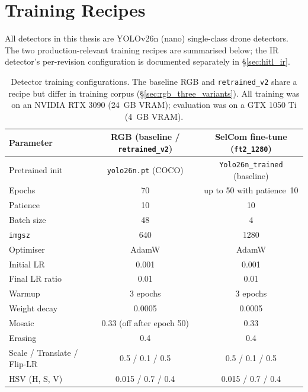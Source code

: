 \documentclass[12pt,a4paper,oneside,openright]{book}
\begin{document}
\section{Training Recipes}
\label{sec:training_recipes}

All detectors in this thesis are YOLOv26n (nano) single-class drone detectors. The two production-relevant training recipes are summarised below; the IR detector's per-revision configuration is documented separately in \S\ref{sec:hitl_ir}.

\begin{table}[htbp]
    \centering
    \caption{Detector training configurations. The baseline RGB and \texttt{retrained\_v2} share a recipe but differ in training corpus (\S\ref{sec:rgb_three_variants}). All training was on an NVIDIA RTX 3090 (24~GB VRAM); evaluation was on a GTX 1050 Ti (4~GB VRAM).}
    \label{tab:training_recipes}
    \begin{tabular}{lcc}
        \toprule
        Parameter & RGB (baseline / \texttt{retrained\_v2}) & SelCom fine-tune (\texttt{ft2\_1280}) \\
        \midrule
        Pretrained init   & \texttt{yolo26n.pt} (COCO) & \texttt{Yolo26n\_trained} (baseline)        \\
        Epochs            & 70                         & up to 50 with patience~10                   \\
        Patience          & 10                         & 10                                          \\
        Batch size        & 48                         & 4                                           \\
        \texttt{imgsz}    & 640                        & 1280                                        \\
        Optimiser         & AdamW                      & AdamW                                       \\
        Initial LR        & 0.001                      & 0.001                                       \\
        Final LR ratio    & 0.01                       & 0.01                                        \\
        Warmup            & 3 epochs                   & 3 epochs                                    \\
        Weight decay      & 0.0005                     & 0.0005                                      \\
        Mosaic            & 0.33 (off after epoch 50)  & 0.33                                        \\
        Erasing           & 0.4                        & 0.4                                         \\
        Scale / Translate / Flip-LR & 0.5 / 0.1 / 0.5  & 0.5 / 0.1 / 0.5                             \\
        HSV (H, S, V)     & 0.015 / 0.7 / 0.4          & 0.015 / 0.7 / 0.4                           \\
        \bottomrule
    \end{tabular}
\end{table}
\end{document}
